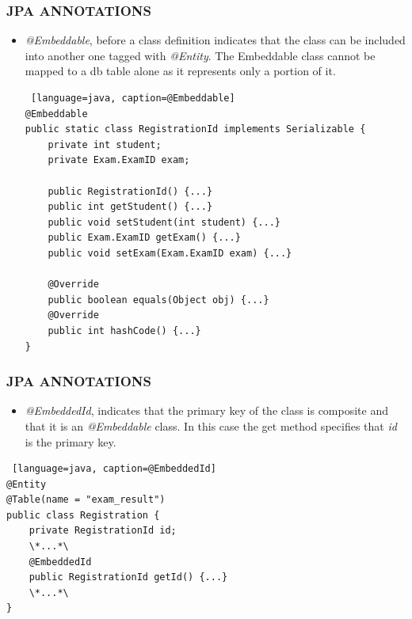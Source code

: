 \documentclass{beamer}
\begin{document}
\begin{frame} [fragile]
	\frametitle{JPA ANNOTATIONS}
	\begin{itemize}
		\item \textit{@Embeddable}, before a class definition indicates that the class can be included into another one tagged with \textit{@Entity}. The Embeddable class cannot be mapped to a db table alone as it represents only a portion of it.
		\begin{lstlisting} [language=java, caption=@Embeddable]
@Embeddable
public static class RegistrationId implements Serializable {
	private int student;
	private Exam.ExamID exam;
	
	public RegistrationId() {...}	
	public int getStudent() {...}
	public void setStudent(int student) {...}
	public Exam.ExamID getExam() {...}
	public void setExam(Exam.ExamID exam) {...}
		
	@Override
	public boolean equals(Object obj) {...}		
	@Override
	public int hashCode() {...}
}
		\end{lstlisting}
	\end{itemize}
\end{frame}

\begin{frame} [fragile]
	\frametitle{JPA ANNOTATIONS}
	\begin{itemize}
		\item \textit{@EmbeddedId}, indicates that the primary key of the class is composite and that it is an \textit{@Embeddable} class. In this case the get method specifies that \textit{id} is the primary key.
	\end{itemize}
	\begin{lstlisting} [language=java, caption=@EmbeddedId]
@Entity
@Table(name = "exam_result")
public class Registration {
	private RegistrationId id;
	\*...*\
	@EmbeddedId
	public RegistrationId getId() {...}
	\*...*\
}
	\end{lstlisting}
\end{frame}
\end{document}
